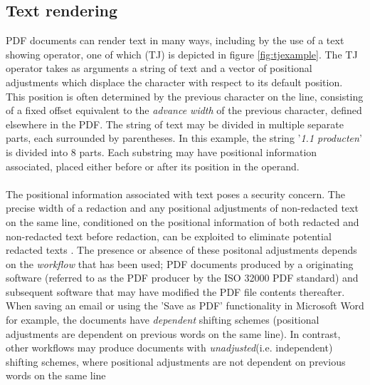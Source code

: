 \subsection{Text rendering}
PDF documents can render text in many ways, including by the use of a text showing operator, one of which (TJ) is depicted in figure \ref{fig:tjexample}. The TJ operator takes as arguments a string of text and a vector of positional adjustments which displace the character with respect to its default position. This position is often determined by the previous character on the line, consisting of a fixed offset equivalent to the \textit{advance width} of the previous character, defined elsewhere in the PDF. The string of text may be divided in multiple separate parts, each surrounded by parentheses. In this example, the string '\textit{1.1 producten}' is divided into 8 parts. Each substring may have positional information associated, placed either before or after its position in the operand. 
\\\\
The positional information associated with text poses a security concern. The precise width of a redaction and any positional adjustments of non-redacted text on the same line, conditioned on the positional information of both redacted and non-redacted text before redaction, can be exploited to eliminate potential redacted texts \cite{bland2022story}. The presence or absence of these positonal adjustments depends on the \textit{workflow} that has been used; PDF documents produced by a originating software (referred to as the PDF producer by the ISO 32000 PDF standard) and subsequent software that may have modified the PDF file contents thereafter. When saving an email or using the 'Save as PDF' functionality in Microsoft Word for example, the documents have \textit{dependent} shifting schemes (positional adjustments are dependent on previous words on the same line). In contrast, other workflows may produce documents with \textit{unadjusted}(i.e. independent) shifting schemes, where positional adjustments are not dependent on previous words on the same line
